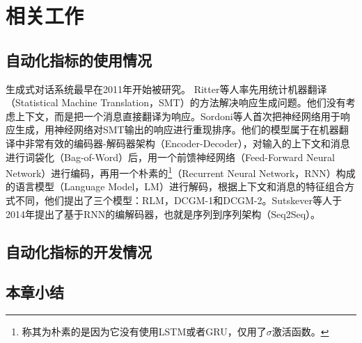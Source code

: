 
\chapter{相关工作}\label{ch:相关工作}
\section{自动化指标的使用情况}
%
生成式对话系统最早在2011年开始被研究。
Ritter等人率先用统计机器翻译（Statistical Machine Translation，SMT）的方法解决响应生成问题。他们没有考虑上下文，而是把一个消息直接翻译为响应。Sordoni等人首次把神经网络用于响应生成，用神经网络对SMT输出的响应进行重现排序。他们的模型属于在机器翻译中非常有效的编码器-解码器架构（Encoder-Decoder），对输入的上下文和消息进行词袋化（Bag-of-Word）后，用一个前馈神经网络（Feed-Forward Neural Network）进行编码，再用一个朴素的\footnote{称其为朴素的是因为它没有使用LSTM或者GRU，仅用了$\sigma$激活函数。}（Recurrent Neural Network，RNN）构成的语言模型（Language Model，LM）进行解码，根据上下文和消息的特征组合方式不同，他们提出了三个模型：RLM，DCGM-1和DCGM-2。Sutskever等人于2014年提出了基于RNN的编解码器，也就是序列到序列架构（Seq2Seq）。


\section{自动化指标的开发情况}

\section{本章小结}\label{sec:本章小结}
